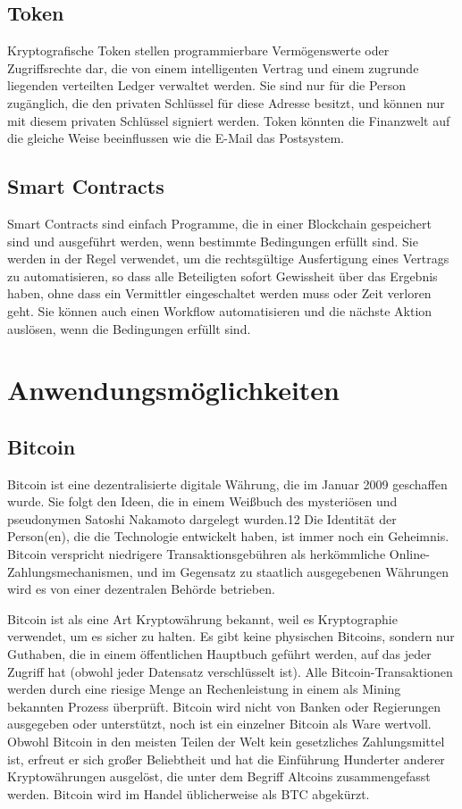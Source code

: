 \subsection{Token}
Kryptografische Token stellen programmierbare Vermögenswerte oder Zugriffsrechte dar, die von einem intelligenten Vertrag und einem zugrunde liegenden verteilten Ledger verwaltet werden. Sie sind nur für die Person zugänglich, die den privaten Schlüssel für diese Adresse besitzt, und können nur mit diesem privaten Schlüssel signiert werden. Token könnten die Finanzwelt auf die gleiche Weise beeinflussen wie die E-Mail das Postsystem.
\subsection{Smart Contracts}
Smart Contracts sind einfach Programme, die in einer Blockchain gespeichert sind und ausgeführt werden, wenn bestimmte Bedingungen erfüllt sind. Sie werden in der Regel verwendet, um die rechtsgültige Ausfertigung eines Vertrags zu automatisieren, so dass alle Beteiligten sofort Gewissheit über das Ergebnis haben, ohne dass ein Vermittler eingeschaltet werden muss oder Zeit verloren geht. Sie können auch einen Workflow automatisieren und die nächste Aktion auslösen, wenn die Bedingungen erfüllt sind.


\section{Anwendungsmöglichkeiten}
\subsection{Bitcoin}
Bitcoin ist eine dezentralisierte digitale Währung, die im Januar 2009 geschaffen wurde. Sie folgt den Ideen, die in einem Weißbuch des mysteriösen und pseudonymen Satoshi Nakamoto dargelegt wurden.12 Die Identität der Person(en), die die Technologie entwickelt haben, ist immer noch ein Geheimnis. Bitcoin verspricht niedrigere Transaktionsgebühren als herkömmliche Online-Zahlungsmechanismen, und im Gegensatz zu staatlich ausgegebenen Währungen wird es von einer dezentralen Behörde betrieben.


Bitcoin ist als eine Art Kryptowährung bekannt, weil es Kryptographie verwendet, um es sicher zu halten. Es gibt keine physischen Bitcoins, sondern nur Guthaben, die in einem öffentlichen Hauptbuch geführt werden, auf das jeder Zugriff hat (obwohl jeder Datensatz verschlüsselt ist). Alle Bitcoin-Transaktionen werden durch eine riesige Menge an Rechenleistung in einem als Mining bekannten Prozess überprüft. Bitcoin wird nicht von Banken oder Regierungen ausgegeben oder unterstützt, noch ist ein einzelner Bitcoin als Ware wertvoll. Obwohl Bitcoin in den meisten Teilen der Welt kein gesetzliches Zahlungsmittel ist, erfreut er sich großer Beliebtheit und hat die Einführung Hunderter anderer Kryptowährungen ausgelöst, die unter dem Begriff Altcoins zusammengefasst werden. Bitcoin wird im Handel üblicherweise als BTC abgekürzt.
